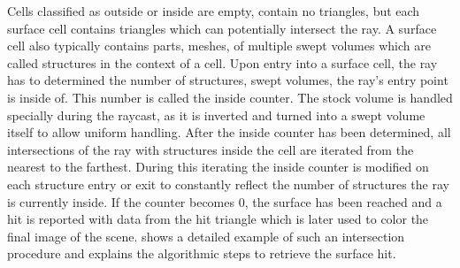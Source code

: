 Cells classified as outside or inside are empty, \ie contain no triangles, but each surface cell contains triangles which can potentially intersect the ray.
A surface cell also typically contains parts, \ie meshes, of multiple swept volumes which are called structures in the context of a cell.
Upon entry into a surface cell, the ray has to determined the number of structures, \ie swept volumes, the ray's entry point is inside of.
This number is called the inside counter.
The stock volume is handled specially during the raycast, as it is inverted and turned into a swept volume itself to allow uniform handling.
After the inside counter has been determined, all intersections of the ray with structures inside the cell are iterated from the nearest to the farthest.
During this iterating the inside counter is modified on each structure entry or exit to constantly reflect the number of structures the ray is currently inside.
If the counter becomes 0, the surface has been reached and a hit is reported with data from the hit triangle which is later used to color the final image of the scene.
 shows a detailed example of such an intersection procedure and explains the algorithmic steps to retrieve the surface hit.

